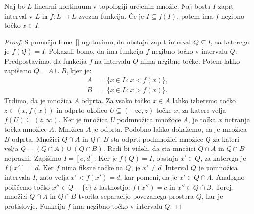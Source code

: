 \documentclass[mat2]{fmfdelo}
\begin{document}
\begin{lema}
Naj bo $L$ linearni kontinuum v topologiji urejenih množic. Naj bosta $I$ zaprt interval v $L$ in $f:L \to L$ zvezna funkcija. Če je $I \subseteq f(I)$, potem ima $f$ negibno točko $x \in I$.
\end{lema}
\begin{proof}
S pomočjo leme~\ref{} ugotovimo, da obstaja zaprt interval $Q \subseteq I$, za katerega je $f(Q) = I$. Pokazali bomo, da ima funkcija $f$ negibno točko v intervalu $Q$. Predpostavimo, da funkcija $f$ na intervalu $Q$ nima negibne točke. Potem lahko zapišemo $Q = A \cup B$, kjer je:
\begin{equation*} %
\begin{split}
A &= \{x \in L : x < f(x)\}, \\ 
B &= \{x \in L : x > f(x)\}.
\end{split}
\end{equation*}
Trdimo, da je množica $A$ odprta. Za vsako točko $x \in A$ lahko izberemo točko $z \in (x, f(x))$ in odprto okolico $U \subseteq  (-\infty, z)$ točke $x$, za katero velja $f(U) \subseteq (z, \infty)$. Ker je množica $U$ podmnožica množoce $A$, je točka $x$ notranja točka množice $A$. Množica $A$ je odprta. Podobno lahko dokažemo, da je množica $B$ odprta. Množici $Q \cap A$ in $Q \cap B$ sta odprti podmnožici množice $Q$ za kateri velja $Q = (Q \cap A) \cup (Q \cap B)$. Radi bi videli, da sta množici $Q \cap A$ in $Q \cap B$ neprazni. Zapišimo $I = [c, d]$. Ker je $f(Q) = I$, obstaja $x' \in Q$, za katerega je $f(x') =d$. Ker $f$ nima fiksne točke na $Q$, je $x' \neq d$. Interval $Q$ je pomnožica intervala $I$, zato velja $x' < f(x') = d$, kar pomeni, da je $x' \in Q \cap A$. Analogno poiščemo točko $x'' \in Q - \{c\}$ z lastnostjo: $f(x'') = c$ in $x'' \in Q \cap B$. Torej, množici $Q \cap A$ in $Q \cap B$ tvorita separacijo povezanega prostora $Q$, kar je protislovje. Funkcija $f$ ima negibno točko v intervalu $Q$.
\end{proof}



\cleardoublepage                           %

\cleardoublepage                           %
\printindex
\end{document}
